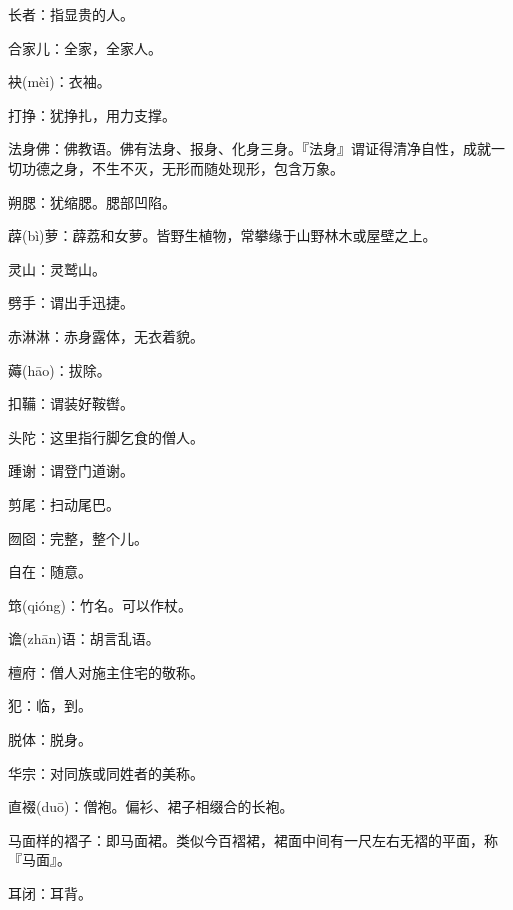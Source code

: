 \startbuffer[566]
长者：指显贵的人。
\stopbuffer


\startbuffer[567]
合家儿：全家，全家人。
\stopbuffer


\startbuffer[568]
袂(mèi)：衣袖。
\stopbuffer


\startbuffer[569]
打挣：犹挣扎，用力支撑。
\stopbuffer


\startbuffer[570]
法身佛：佛教语。佛有法身、报身、化身三身。『法身』谓证得清净自性，成就一切功德之身，不生不灭，无形而随处现形，包含万象。
\stopbuffer


\startbuffer[571]
朔腮：犹缩腮。腮部凹陷。
\stopbuffer


\startbuffer[572]
薜(bì)萝：薜荔和女萝。皆野生植物，常攀缘于山野林木或屋壁之上。
\stopbuffer


\startbuffer[573]
灵山：灵鹫山。
\stopbuffer


\startbuffer[574]
劈手：谓出手迅捷。
\stopbuffer


\startbuffer[575]
赤淋淋：赤身露体，无衣着貌。
\stopbuffer


\startbuffer[576]
薅(hāo)：拔除。
\stopbuffer


\startbuffer[577]
扣鞴：谓装好鞍辔。
\stopbuffer


\startbuffer[578]
头陀：这里指行脚乞食的僧人。
\stopbuffer


\startbuffer[579]
踵谢：谓登门道谢。
\stopbuffer


\startbuffer[580]
剪尾：扫动尾巴。
\stopbuffer


\startbuffer[581]
囫囵：完整，整个儿。
\stopbuffer


\startbuffer[582]
自在：随意。
\stopbuffer


\startbuffer[583]
筇(qióng)：竹名。可以作杖。
\stopbuffer


\startbuffer[584]
谵(zhān)语：胡言乱语。
\stopbuffer


\startbuffer[585]
檀府：僧人对施主住宅的敬称。
\stopbuffer


\startbuffer[586]
犯：临，到。
\stopbuffer


\startbuffer[587]
脱体：脱身。
\stopbuffer


\startbuffer[588]
华宗：对同族或同姓者的美称。
\stopbuffer


\startbuffer[589]
直裰(duō)：僧袍。偏衫、裙子相缀合的长袍。
\stopbuffer


\startbuffer[590]
马面样的褶子：即马面裙。类似今百褶裙，裙面中间有一尺左右无褶的平面，称『马面』。
\stopbuffer


\startbuffer[591]
耳闭：耳背。
\stopbuffer



